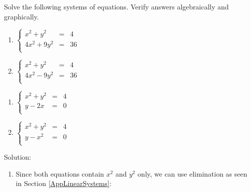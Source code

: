 \begin{ex}  \label{nonlinearex1} Solve the following systems of equations.  Verify  answers algebraically and  graphically.

\begin{multicols}{2}

\begin{enumerate}

\item  $\left\{\begin{array}{rcr}  x^2 +y^2 & = & 4 \\ 4x^2+9y^2 & = & 36 \\ \end{array} \right.$

\item  $\left\{\begin{array}{rcr}  x^2 +y^2 & = & 4 \\ 4x^2-9y^2 & = & 36 \\ \end{array} \right.$

\setcounter{HW}{\value{enumi}}
\end{enumerate}
\end{multicols}

\begin{multicols}{2}

\begin{enumerate}

\setcounter{enumi}{\value{HW}}

\item  $\left\{\begin{array}{rcr}  x^2 +y^2 & = & 4 \\ y - 2x & = & 0 \\ \end{array} \right.$

\item  $\left\{\begin{array}{rcr}  x^2 +y^2 & = & 4 \\ y  - x^2 & = & 0 \\ \end{array} \right.$

\end{enumerate}

\end{multicols}

{\sc Solution:}

\begin{enumerate}

\item  Since both equations contain $x^2$ and $y^2$ only, we can use elimination as seen in Section \ref{AppLinearSystems}:


\end{enumerate}
\end{ex}
